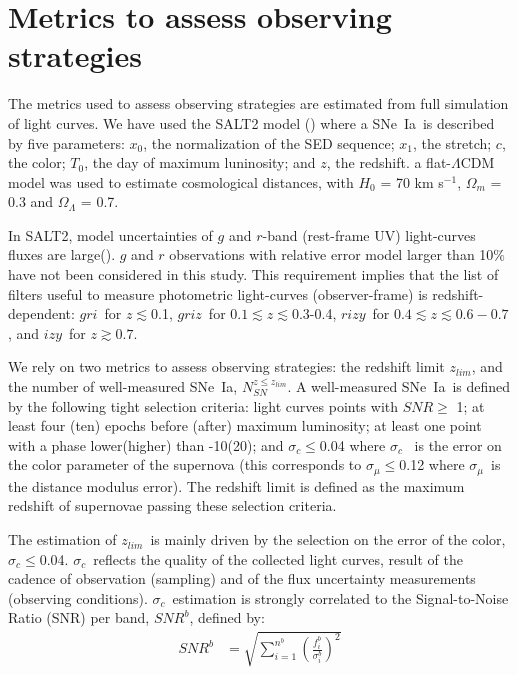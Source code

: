 \documentclass[skiphelvet,twocolumn]{aastex63}
\newcommand{\snrb}{\mbox{$SNR^b$}}
\newcommand{\bg}{{$g$}}
\newcommand{\br}{{$r$}}
\newcommand{\bi}{{$i$}}
\newcommand{\bz}{{$z$}}
\newcommand{\by}{{$y$}}
\newcommand{\snstrech}{\mbox{$x_1$}}
\newcommand{\daymax}{$T_0$}
\newcommand{\sigc}{\mbox{$\sigma_c$}}
\newcommand{\sigmu}{\mbox{$\sigma_\mu$}}
\newcommand{\zlim}{\mbox{$z_{lim}$}}
\newcommand{\sne}{{SNe~Ia}}
\newcommand{\nsn}{{$N_{SN}^{z\leq z_{lim}}$}}
\newcommand{\snx}{\mbox{$x_0$}}
\newcommand{\sncolor}{\mbox{$c$}}
\begin{document}
\section{Metrics to assess observing strategies}
\label{sec:metrics}
The metrics used to assess observing strategies are estimated from full simulation of light curves. We have used the SALT2 model (\citealt{Guy_2007,Guy_2010}) where a \sne~is described by five parameters: \snx, the normalization of the SED sequence; \snstrech, the stretch; \sncolor, the color; \daymax, the day of maximum luninosity; and $z$, the redshift. a flat-$\Lambda$CDM model was used to estimate cosmological distances, with $H_0$ = 70 km s$^{-1}$, $\Omega_m$ = 0.3 and $\Omega_\Lambda$ = 0.7.
\par
In SALT2, model uncertainties of $g$ and $r$-band (rest-frame UV) light-curves fluxes are large(\citealt{Guy_2007}). $g$ and $r$ observations with relative error model larger than 10$\%$ have not been considered in this study. This requirement implies that the list of filters useful to measure photometric light-curves (observer-frame) is redshift-dependent: \bg\br\bi~for $z\lesssim$0.1,  \bg\br\bi\bz~for $0.1\lesssim z\lesssim$0.3-0.4, \br\bi\bz\by~for $0.4\lesssim z \lesssim 0.6-0.7$, and \bi\bz\by~for $z\gtrsim 0.7$.
\par
We rely on two metrics to assess observing strategies: the redshift limit \zlim, and the number of well-measured \sne, \nsn. A well-measured \sne~is defined by the following tight selection criteria: light curves points with $SNR\geq$ 1; at least four (ten) epochs before (after) maximum luminosity; at least one point with a phase lower(higher) than -10(20); and \sigc$\leq$0.04 where \sigc~ is the error on the color parameter of the supernova (this corresponds to \sigmu$\leq$0.12 where \sigmu~is the distance modulus error). The redshift limit is defined as the maximum redshift of supernovae passing these selection criteria.
\par
The estimation of \zlim~is mainly driven by the selection on the error of the color, \sigc$\leq$0.04. \sigc~reflects the quality of the collected light curves, result of the cadence of observation (sampling) and of the flux uncertainty measurements (observing conditions). \sigc~estimation is strongly correlated to the Signal-to-Noise Ratio (SNR) per band, \snrb,  defined by:
\begin{equation}
  \begin{aligned}
    SNR^b &= \sqrt{\sum_{i=1}^{n^b}{\left(\frac{f_i^b}{\sigma_i^b}\right)^2}}
    \end{aligned}
  \label{eq:snrb}
\end{equation}
\end{document}
